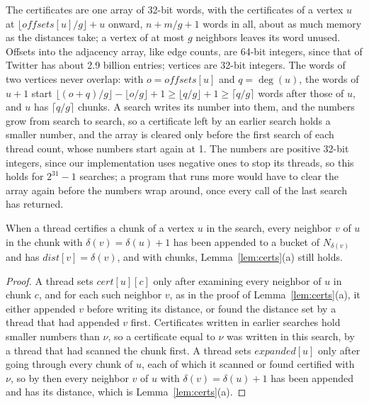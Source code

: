 The certificates are one array of 32-bit words, with the certificates of a vertex $u$ at $\lfloor \mathit{offsets}[u] / g \rfloor + u$ onward, $n + m/g + 1$ words in all, about as much memory as the distances take; a vertex of at most $g$ neighbors leaves its word unused. Offsets into the adjacency array, like edge counts, are 64-bit integers, since that of Twitter has about 2.9 billion entries; vertices are 32-bit integers. The words of two vertices never overlap: with $o = \mathit{offsets}[u]$ and $q = \deg(u)$, the words of $u + 1$ start $\lfloor (o + q)/g \rfloor - \lfloor o/g \rfloor + 1 \geq \lfloor q/g \rfloor + 1 \geq \lceil q/g \rceil$ words after those of $u$, and $u$ has $\lceil q/g \rceil$ chunks. A search writes its number into them, and the numbers grow from search to search, so a certificate left by an earlier search holds a smaller number, and the array is cleared only before the first search of each thread count, whose numbers start again at 1. The numbers are positive 32-bit integers, since our implementation uses negative ones to stop its threads, so this holds for $2^{31}-1$ searches; a program that runs more would have to clear the array again before the numbers wrap around, once every call of the last search has returned.

\begin{lemma}
\label{lem:chunks}
When a thread certifies a chunk of a vertex $u$ in the search, every neighbor $v$ of $u$ in the chunk with $\delta(v) = \delta(u) + 1$ has been appended to a bucket of $N_{\delta(v)}$ and has $\mathit{dist}[v] = \delta(v)$, and with chunks, Lemma~\ref{lem:certs}(a) still holds.
\end{lemma}
\begin{proof}
A thread sets $\mathit{cert}[u][c]$ only after examining every neighbor of $u$ in chunk $c$, and for each such neighbor $v$, as in the proof of Lemma~\ref{lem:certs}(a), it either appended $v$ before writing its distance, or found the distance set by a thread that had appended $v$ first. Certificates written in earlier searches hold smaller numbers than $\nu$, so a certificate equal to $\nu$ was written in this search, by a thread that had scanned the chunk first. A thread sets $\mathit{expanded}[u]$ only after going through every chunk of $u$, each of which it scanned or found certified with $\nu$, so by then every neighbor $v$ of $u$ with $\delta(v) = \delta(u) + 1$ has been appended and has its distance, which is Lemma~\ref{lem:certs}(a).
\end{proof}


